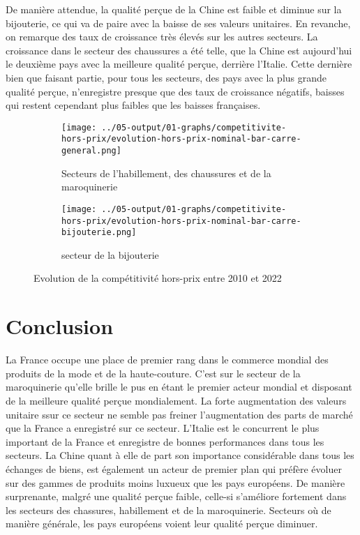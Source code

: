 \documentclass[french,10pt,a4paper]{article}
\begin{document}
De manière attendue, la qualité perçue de la Chine est faible et diminue sur la bijouterie, ce qui va de paire avec la baisse de ses valeurs unitaires. En revanche, on remarque des taux de croissance très élevés sur les autres secteurs. La croissance dans le secteur des chaussures a été telle, que la Chine est aujourd'hui le deuxième pays avec la meilleure qualité perçue, derrière l'Italie. Cette dernière bien que faisant partie, pour tous les secteurs, des pays avec la plus grande qualité perçue, n'enregistre presque que des taux de croissance négatifs, baisses qui restent cependant plus faibles que les baisses françaises. 


\begin{figure}[!h]
  \centering
  \begin{subfigure}{\textwidth}
    \centering    \texttt{[image: ../05-output/01-graphs/competitivite-hors-prix/evolution-hors-prix-nominal-bar-carre-general.png]}
    \caption{Secteurs de l'habillement, des chaussures et de la maroquinerie}
    \label{fig:evolution-hors-prix-nominal-bar-carre-general}
  \end{subfigure}
  \vspace{0.5cm}
  \begin{subfigure}{\textwidth}
    \centering \texttt{[image: ../05-output/01-graphs/competitivite-hors-prix/evolution-hors-prix-nominal-bar-carre-bijouterie.png]}
 \caption{secteur de la bijouterie}
 \label{fig:evolution-hors-prix-nominal-bar-carre-bijouterie.png}
  \end{subfigure}
  \caption{Evolution de la compétitivité hors-prix entre 2010 et 2022}
  \label{fig:hors-prix}
\end{figure}


\section{Conclusion}
La France occupe une place de premier rang dans le commerce mondial des produits de la mode et de la haute-couture. C'est sur le secteur de la maroquinerie qu'elle brille le pus en étant le premier acteur mondial et disposant de la meilleure qualité perçue mondialement. La forte augmentation des valeurs unitaire ssur ce secteur ne semble pas freiner l'augmentation des parts de marché que la France a enregistré sur ce secteur. L'Italie est le concurrent le plus important de la France et enregistre de bonnes performances dans tous les secteurs. La Chine quant à elle de part son importance considérable dans tous les échanges de biens, est également un acteur de premier plan qui préfère évoluer sur des gammes de produits moins luxueux que les pays européens. De manière surprenante, malgré une qualité perçue faible, celle-si s'améliore fortement dans les secteurs des chassures, habillement et de la maroquinerie. Secteurs où de manière générale, les pays européens voient leur qualité perçue diminuer. 
\end{document}
